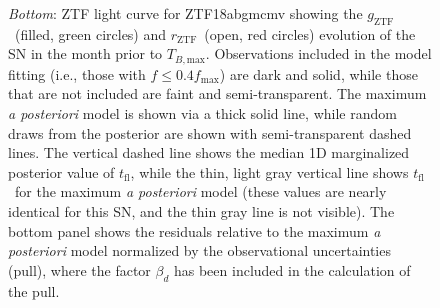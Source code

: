 \documentclass[twocolumn]{./aastex63}
\newcommand{\rztf}{$r_\mathrm{ZTF}$}
\newcommand{\gztf}{$g_\mathrm{ZTF}$}
\newcommand{\tfl}{$t_\mathrm{fl}$}
\newcommand{\tbmax}{$T_{B,\mathrm{max}}$}
\begin{document}
\begin{figure}
{    \textit{Bottom}: ZTF light curve for ZTF18abgmcmv showing the \gztf\
    (filled, green circles) and \rztf\ (open, red circles) evolution of the SN
    in the month prior to \tbmax. Observations included in the model fitting
    (i.e., those with $f \le 0.4 f_\mathrm{max}$) are dark and solid, while
    those that are not included are faint and semi-transparent. The maximum
    \textit{a posteriori} model is shown via a thick solid line, while random
    draws from the posterior are shown with semi-transparent dashed lines. The
    vertical dashed line shows the median 1D marginalized posterior value of
    \tfl, while the thin, light gray vertical line shows \tfl\ for the maximum
    \textit{a posteriori} model (these values are nearly identical for this
    SN, and the thin gray line is not visible). The bottom panel shows the
    residuals relative to the maximum \textit{a posteriori} model normalized
    by the observational uncertainties (pull), where the factor $\beta_d$ has
    been included in the calculation of the pull.}
    \label{fig:corner_good}
\end{figure}
\end{document}
